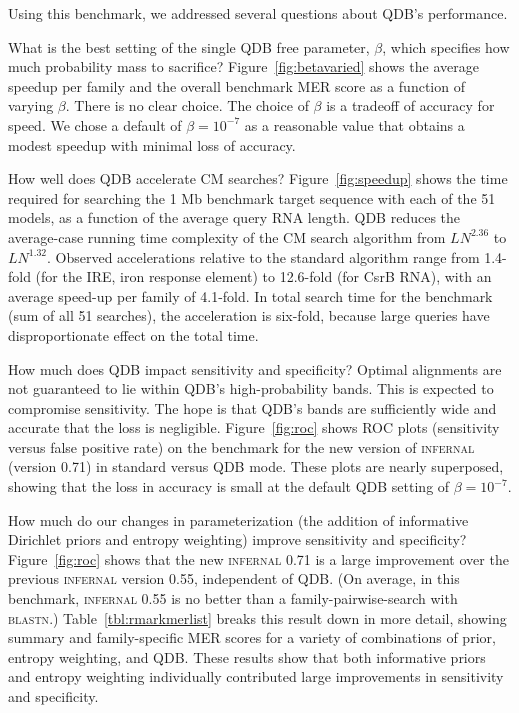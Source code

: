 \documentclass[11pt]{article}
\newif\ifdraft
\begin{document}
Using this benchmark, we addressed several questions about QDB's
performance.

What is the best setting of the single QDB free parameter, $\beta$,
which specifies how much probability mass to sacrifice?
Figure~\ref{fig:betavaried} shows the average speedup per family and
the overall benchmark MER score as a function of varying
$\beta$. There is no clear choice. The choice of $\beta$ is a tradeoff
of accuracy for speed. We chose a default of $\beta = 10^{-7}$ as a
reasonable value that obtains a modest speedup with minimal loss of
accuracy.

\ifdraft

\fi

How well does QDB accelerate CM searches?  Figure~\ref{fig:speedup}
shows the time required for searching the 1 Mb benchmark target
sequence with each of the 51 models, as a function of the average
query RNA length. QDB reduces the average-case running time complexity
of the CM search algorithm from $LN^{2.36}$ to $LN^{1.32}$. Observed
accelerations relative to the standard algorithm range from 1.4-fold
(for the IRE, iron response element) to 12.6-fold (for CsrB RNA), with
an average speed-up per family of 4.1-fold. In total search time for
the benchmark (sum of all 51 searches), the acceleration is six-fold,
because large queries have disproportionate effect on the total
time.

\ifdraft

\fi

How much does QDB impact sensitivity and specificity? Optimal
alignments are not guaranteed to lie within QDB's high-probability
bands. This is expected to compromise sensitivity. The hope is
that QDB's bands are sufficiently wide and accurate that the loss is
negligible.  Figure~\ref{fig:roc} shows ROC plots (sensitivity versus
false positive rate) on the benchmark for the new version of
\textsc{infernal} (version 0.71) in standard versus QDB mode.  These
plots are nearly superposed, showing that the loss in accuracy is
small at the default QDB setting of $\beta=10^{-7}$.

\ifdraft

\fi

How much do our changes in parameterization (the addition of
informative Dirichlet priors and entropy weighting) improve
sensitivity and specificity? Figure~\ref{fig:roc} shows that the new
\textsc{infernal} 0.71 is a large improvement over the previous
\textsc{infernal} version 0.55, independent of QDB. (On average, in
this benchmark, \textsc{infernal} 0.55 is no better than a
family-pairwise-search with \textsc{blastn}.) Table~\ref{tbl:rmarkmerlist}
breaks this result down in more detail, showing summary and
family-specific MER scores for a variety of combinations of prior,
entropy weighting, and QDB. These results show that both informative
priors and entropy weighting individually contributed large
improvements in sensitivity and specificity.
\end{document}
